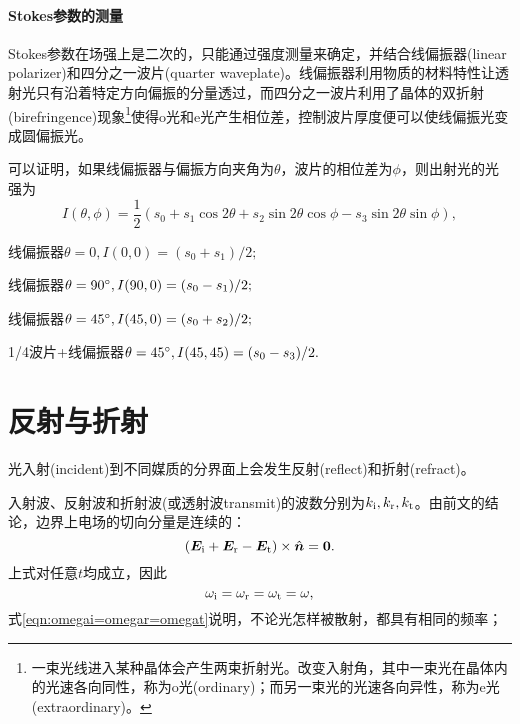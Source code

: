 \paragraph{Stokes参数的测量}
Stokes参数在场强上是二次的，只能通过强度测量来确定，并结合线偏振器(linear polarizer)和四分之一波片(quarter waveplate)。线偏振器利用物质的材料特性让透射光只有沿着特定方向偏振的分量透过，而四分之一波片利用了晶体的双折射(birefringence)现象\footnote{一束光线进入某种晶体会产生两束折射光。改变入射角，其中一束光在晶体内的光速各向同性，称为o光(ordinary)；而另一束光的光速各向异性，称为e光(extraordinary)。}使得o光和e光产生相位差，控制波片厚度便可以使线偏振光变成圆偏振光。

可以证明，如果线偏振器与偏振方向夹角为$\theta$，波片的相位差为$\phi$，则出射光的光强为
\[
    I(\theta,\phi)=\frac12(s_0+s_1\cos2\theta+s_2\sin2\theta\cos\phi-s_3\sin2\theta\sin\phi),
\]
\begin{compactitem}
	\item 线偏振器$\theta=0,I(0,0)=(s_0+s_1)/2;$
    \item 线偏振器$\theta=90^\circ,I(90,0)=(s_0-s_1)/2;$
    \item 线偏振器$\theta=45^\circ,I(45,0)=(s_0+s_2)/2;$
    \item 1/4波片+线偏振器$\theta=45^\circ,I(45,45)=(s_0-s_3)/2.$
\end{compactitem}
\section{反射与折射}
光入射(incident)到不同媒质的分界面上会发生反射(reflect)和折射(refract)。
\begin{center}
\end{center}
入射波、反射波和折射波(或透射波transmit)的波数分别为$k_{\mathrm{i}},k_\text r,k_\text t$。由前文的结论，边界上电场的切向分量是连续的：
\[
    (\bm E_{\mathrm{i}}+\bm E_\text r-\bm E_\text t)\times\mathop{}\!\hat{\bm{n}}=\bm 0.
\]
上式对任意$t$均成立，因此
\begin{equation}
    \label{eqn:omegai=omegar=omegat}
    \omega_{\mathrm{i}}=\omega_\text r=\omega_\text t=\omega,
\end{equation}
式\eqref{eqn:omegai=omegar=omegat}说明，不论光怎样被散射，都具有相同的频率；

